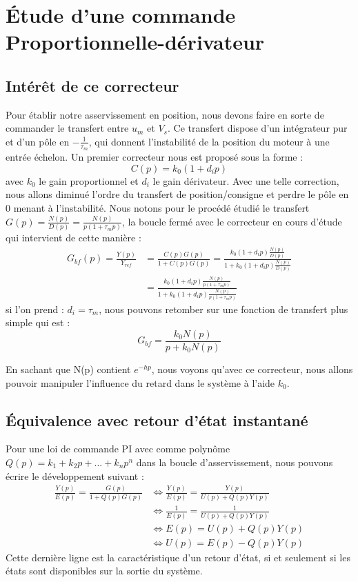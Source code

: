 \chapter{Étude d'une commande Proportionnelle-dérivateur}
\section{Intérêt de ce correcteur}
Pour établir notre asservissement en position, nous devons faire en sorte de commander le transfert entre $u_m$ et $V_s$. Ce transfert dispose d'un intégrateur pur et d'un pôle en $-\frac{1}{\tau _m}$, qui donnent l'instabilité de la position du moteur à une entrée échelon. Un premier correcteur nous est proposé sous la forme :
\begin{equation}\label{eqn:correcteurProportionnel}
C(p) = k_0(1+d_ip)
\end{equation} 
avec $k_0$ le gain proportionnel et $d_i$ le gain dérivateur. Avec une telle correction, nous allons diminué l'ordre du transfert de position/consigne et perdre le pôle en 0 menant à l'instabilité. Nous notons pour le procédé étudié le transfert $G(p) = \frac{N(p)}{D(p)}=\frac{N(p)}{p(1+\tau_mp)}$, la boucle fermé avec le correcteur en cours d'étude qui intervient de cette manière : 
\begin{align*}
G_{bf}(p) = \frac{Y(p)}{Y_{ref}}	&= \frac{C(p)G(p)}{1+C(p)G(p)} 
										= \frac{k_0(1+d_ip) \frac{N(p)}{D(p)}}{1+k_0(1+d_ip) \frac{N(p)}{D(p)}}	\\
									&= \frac{k_0(1+d_ip) \frac{N(p)}{p(1+\tau_mp)}}{1+ k_0(1+d_ip) \frac{N(p)}{p(1+\tau_mp)}}
\end{align*}
si l'on prend : $d_i = \tau_m$, nous pouvons retomber sur une fonction de transfert plus simple qui est :
\begin{equation}\label{eqn:boucleFermeC_PD}
G_{bf} = \frac{k_0 N(p)}{p+k_0N(p)}
\end{equation}

En sachant que N(p) contient $e^{-hp}$, nous voyons qu'avec ce correcteur, nous allons pouvoir manipuler l'influence du retard dans le système à l'aide $k_0$.
\section{Équivalence avec retour d'état instantané}
Pour une loi de commande PI avec comme polynôme $Q(p) = k_1+k_2p+...+k_np^n$ dans la boucle d'asservissement, nous pouvons écrire le développement suivant : 
\begin{align*}
\frac{Y(p)}{E(p)} = \frac{G(p)}{1 + Q(p)G(p)} & \Leftrightarrow \frac{Y(p)}{E(p)} = \frac{Y(p)}{U(p) + Q(p)Y(p)}\\
&\Leftrightarrow \frac{1}{E(p)} = \frac{1}{U(p) + Q(p)Y(p)} \\
& \Leftrightarrow E(p) = U(p) + Q(p)Y(p)\\
& \Leftrightarrow U(p) = E(p) - Q(p)Y(p)
\end{align*} 
Cette dernière ligne est la caractéristique d'un retour d'état, si et seulement si les états sont disponibles sur la sortie du système.